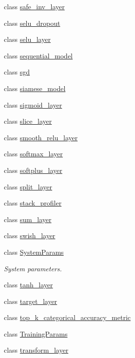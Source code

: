 \begin{DoxyCompactItemize}
\item 
class \hyperlink{classlbann_1_1safe__inv__layer}{safe\+\_\+inv\+\_\+layer}
\item 
class \hyperlink{classlbann_1_1selu__dropout}{selu\+\_\+dropout}
\item 
class \hyperlink{classlbann_1_1selu__layer}{selu\+\_\+layer}
\item 
class \hyperlink{classlbann_1_1sequential__model}{sequential\+\_\+model}
\item 
class \hyperlink{classlbann_1_1sgd}{sgd}
\item 
class \hyperlink{classlbann_1_1siamese__model}{siamese\+\_\+model}
\item 
class \hyperlink{classlbann_1_1sigmoid__layer}{sigmoid\+\_\+layer}
\item 
class \hyperlink{classlbann_1_1slice__layer}{slice\+\_\+layer}
\item 
class \hyperlink{classlbann_1_1smooth__relu__layer}{smooth\+\_\+relu\+\_\+layer}
\item 
class \hyperlink{classlbann_1_1softmax__layer}{softmax\+\_\+layer}
\item 
class \hyperlink{classlbann_1_1softplus__layer}{softplus\+\_\+layer}
\item 
class \hyperlink{classlbann_1_1split__layer}{split\+\_\+layer}
\item 
class \hyperlink{classlbann_1_1stack__profiler}{stack\+\_\+profiler}
\item 
class \hyperlink{classlbann_1_1sum__layer}{sum\+\_\+layer}
\item 
class \hyperlink{classlbann_1_1swish__layer}{swish\+\_\+layer}
\item 
class \hyperlink{classlbann_1_1SystemParams}{System\+Params}
\begin{DoxyCompactList}\small\item\em System parameters. \end{DoxyCompactList}\item 
class \hyperlink{classlbann_1_1tanh__layer}{tanh\+\_\+layer}
\item 
class \hyperlink{classlbann_1_1target__layer}{target\+\_\+layer}
\item 
class \hyperlink{classlbann_1_1top__k__categorical__accuracy__metric}{top\+\_\+k\+\_\+categorical\+\_\+accuracy\+\_\+metric}
\item 
class \hyperlink{classlbann_1_1TrainingParams}{Training\+Params}
\item 
class \hyperlink{classlbann_1_1transform__layer}{transform\+\_\+layer}

\end{DoxyCompactItemize}
